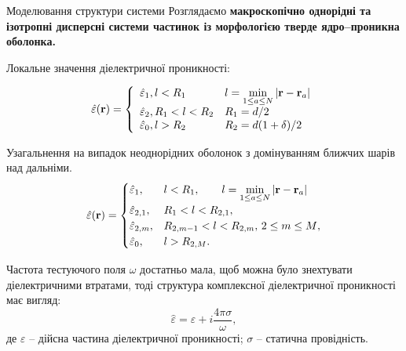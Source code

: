 \documentclass[10pt]{beamer}
\begin{document}
\begin{frame}{Моделювання структури системи}
\footnotesize
Розглядаємо \textbf{макроскопічно однорідні та ізотропні дисперсні системи частинок із морфологією тверде ядро--проникна оболонка.}

\vspace{-5pt}
Локальне значення діелектричної проникності:
\vspace{-15pt}

$$
    \hat{\varepsilon}({\bf r}) = \left\{ 
    \begin{array}{ll}
    \hat{\varepsilon}_1, l<R_1 & l = \min\limits_{1 \leq a \leq N} |{\bf r} - {\bf r}_a| \\
    \hat{\varepsilon}_2, R_1 < l < R_2 & R_1 = d/2 \\
    \hat{\varepsilon}_0, l > R_2 & R_2 = d(1+\delta)/2
    \end{array}    
    \right. 
$$

Узагальнення на випадок неоднорідних оболонок з домінуванням ближчих шарів над дальніми.
\begin{equation*}\label{eq:distr1}
\hat{\varepsilon}({\bf r})=\begin{cases}
\hat{\varepsilon}_1, & l<R_1, \qquad l=\min\limits_{1 \leq a \leq N} |{\bf r} - {\bf r}_a| \\
\hat{\varepsilon}_{2,1}, &  R_1<l<R_{2,1},\\
{\hat{\varepsilon}_{2,m}}, & { R_{2,m-1}<l<R_{2,m}, \,2 \leq m \leq M},\\
\hat{\varepsilon}_0, & l>R_{2,M}.
\end{cases}
\end{equation*}

Частота тестуючого поля $\omega$ достатньо мала, щоб можна було знехтувати діелектричними втратами, тоді структура комплексної діелектричної проникності має вигляд: 
\vspace{-5pt}
$$
    \hat{\varepsilon} = \varepsilon + i \frac{4\pi\sigma}{\omega},
$$
де $\varepsilon$ -- дійсна частина діелектричної проникності; $\sigma$ -- статична провідність.

\end{frame}


\end{document}
